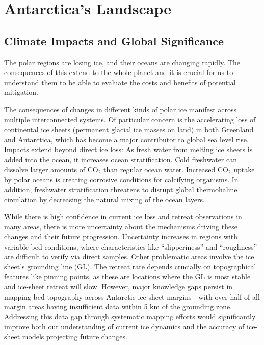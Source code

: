 \chapter{Antarctica's Landscape}\label{why}
\section{Climate Impacts and Global Significance}

The polar regions are losing ice, and their oceans are changing rapidly\cite{O_C_in_changingClimate}. The consequences of this extend to the whole planet and it is crucial for us to understand them to be able to evaluate the costs and benefits of potential mitigation. 

The consequences of changes in different kinds of polar ice manifest across multiple interconnected systems. Of particular concern is the accelerating loss of continental ice sheets (permanent glacial ice masses on land) in both Greenland and Antarctica, which has become a major contributor to global sea level rise\cite{O_C_in_changingClimate}. Impacts extend beyond direct ice loss: As fresh water from melting ice sheets is added into the ocean, it increases ocean stratification. Cold freshwater can dissolve larger amounts of $\mathrm{CO_2}$ than regular ocean water. Increased $\mathrm{CO_2}$ uptake by polar oceans is creating corrosive conditions for calcifying organisms\cite{O_C_in_changingClimate}. In addition, freshwater stratification threatens to disrupt global thermohaline circulation\cite{Jacobs_2004} by decreasing the natural mixing of the ocean layers.
 
While there is high confidence in current ice loss and retreat observations in many areas, there is more uncertainty about the mechanisms driving these changes and their future progression\cite{Fox-Kemper_2021}. Uncertainty increases in regions with variable bed conditions, where characteristics like ``slipperiness'' and ``roughness'' are difficult to verify via direct samples. Other problematic areas involve the ice sheet's grounding line (GL). The retreat rate depends crucially on topographical features like pinning points, as these are locations where the GL is most stable and ice-sheet retreat will slow\cite{Fox-Kemper_2021}. However, major knowledge gaps persist in mapping bed topography across Antarctic ice sheet margins - with over half of all margin areas having insufficient data within 5 km of the grounding zone\cite{RINGS_2022}. Addressing this data gap through systematic mapping efforts would significantly improve both our understanding of current ice dynamics and the accuracy of ice-sheet models projecting future changes.

